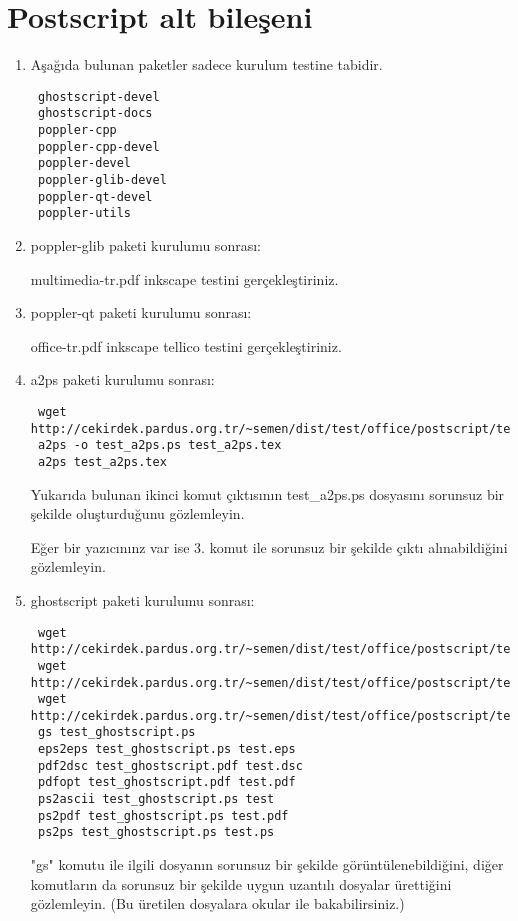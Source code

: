 \documentclass[a4paper,10pt]{article}
\begin{document}
\section{ Postscript alt bileşeni}
\begin{enumerate}
\item Aşağıda bulunan paketler sadece kurulum testine tabidir.
\begin{verbatim}
 ghostscript-devel
 ghostscript-docs
 poppler-cpp
 poppler-cpp-devel
 poppler-devel
 poppler-glib-devel
 poppler-qt-devel
 poppler-utils
\end{verbatim}

\item poppler-glib paketi kurulumu sonrası:

multimedia-tr.pdf inkscape testini gerçekleştiriniz.
\item poppler-qt paketi kurulumu sonrası:

office-tr.pdf inkscape tellico testini gerçekleştiriniz.

\item a2ps paketi kurulumu sonrası:
\begin{verbatim}
 wget http://cekirdek.pardus.org.tr/~semen/dist/test/office/postscript/test_a2ps.tex
 a2ps -o test_a2ps.ps test_a2ps.tex
 a2ps test_a2ps.tex
\end{verbatim}

Yukarıda bulunan ikinci komut çıktısının test\_a2ps.ps dosyasını sorunsuz bir şekilde oluşturduğunu gözlemleyin.

Eğer bir yazıcınınz var ise 3. komut ile sorunsuz bir şekilde çıktı alınabildiğini gözlemleyin.

\item ghostscript paketi kurulumu sonrası:
\begin{verbatim}
 wget http://cekirdek.pardus.org.tr/~semen/dist/test/office/postscript/test_ghostscript.ps
 wget http://cekirdek.pardus.org.tr/~semen/dist/test/office/postscript/test_ghostscript.dvi
 wget http://cekirdek.pardus.org.tr/~semen/dist/test/office/postscript/test_ghostscript.pdf
 gs test_ghostscript.ps
 eps2eps test_ghostscript.ps test.eps
 pdf2dsc test_ghostscript.pdf test.dsc
 pdfopt test_ghostscript.pdf test.pdf
 ps2ascii test_ghostscript.ps test
 ps2pdf test_ghostscript.ps test.pdf
 ps2ps test_ghostscript.ps test.ps
\end{verbatim}

"gs" komutu ile ilgili dosyanın sorunsuz bir şekilde görüntülenebildiğini, diğer komutların da sorunsuz bir şekilde uygun uzantılı dosyalar ürettiğini gözlemleyin. (Bu üretilen dosyalara okular ile bakabilirsiniz.)


\end{enumerate}
\end{document}
